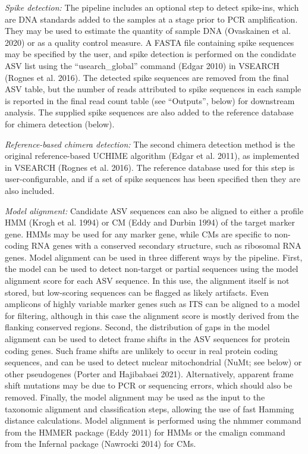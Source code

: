 \documentclass[
]{article}
\begin{document}
\emph{Spike detection:}
The pipeline includes an optional step to detect spike-ins, which are DNA standards added to the samples at a stage prior to PCR amplification.
They may be used to estimate the quantity of sample DNA (Ovaskainen et al. 2020) or as a quality control measure.
A FASTA file containing spike sequences may be specified by the user, and spike detection is performed on the condidate ASV list using the ``usearch\_global'' command (Edgar 2010) in VSEARCH (Rognes et al. 2016).
The detected spike sequences are removed from the final ASV table, but the number of reads attributed to spike sequences in each sample is reported in the final read count table (see ``Outputs'', below) for downstream analysis.
The supplied spike sequences are also added to the reference database for chimera detection (below).

\emph{Reference-based chimera detection:}
The second chimera detection method is the original reference-based UCHIME algorithm (Edgar et al. 2011), as implemented in VSEARCH (Rognes et al. 2016).
The reference database used for this step is user-configurable, and if a set of spike sequences has been specified then they are also included.

\emph{Model alignment:}
Candidate ASV sequences can also be aligned to either a profile HMM (Krogh et al. 1994) or CM (Eddy and Durbin 1994) of the target marker gene.
HMMs may be used for any marker gene, while CMs are specific to non-coding RNA genes with a conserved secondary structure, such as ribosomal RNA genes.
Model alignment can be used in three different ways by the pipeline.
First, the model can be used to detect non-target or partial sequences using the model alignment score for each ASV sequence.
In this use, the alignment itself is not stored, but low-scoring sequences can be flagged as likely artifacts.
Even amplicons of highly variable marker genes such as ITS can be aligned to a model for filtering, although in this case the alignment score is mostly derived from the flanking conserved regions.
Second, the distribution of gaps in the model alignment can be used to detect frame shifts in the ASV sequences for protein coding genes.
Such frame shifts are unlikely to occur in real protein coding sequences, and can be used to detect nuclear mitochondrial (NuMt; see below) or other pseudogenes (Porter and Hajibabaei 2021).
Alternatively, apparent frame shift mutations may be due to PCR or sequencing errors, which should also be removed.
Finally, the model alignment may be used as the input to the taxonomic alignment and classification steps, allowing the use of fast Hamming distance calculations.
Model alignment is performed using the nhmmer command from the HMMER package (Eddy 2011) for HMMs or the cmalign command from the Infernal package (Nawrocki 2014) for CMs.
\end{document}
